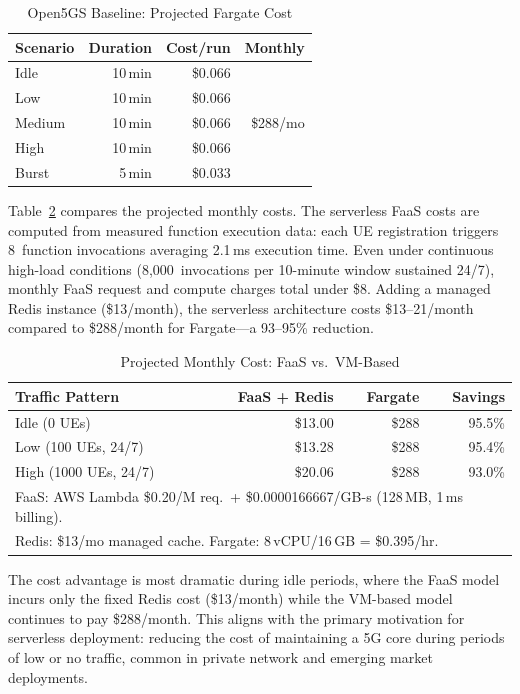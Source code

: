 \documentclass[conference]{IEEEtran}
\begin{document}
\begin{table}[t]
\centering
\caption{Open5GS Baseline: Projected Fargate Cost}
\label{tab:open5gs-cost}
\footnotesize
\begin{tabular}{@{}lrrr@{}}
\toprule
\textbf{Scenario} & \textbf{Duration} & \textbf{Cost/run} & \textbf{Monthly} \\
\midrule
Idle      & 10\,min & \$0.066 & \multirow{5}{*}{\$288/mo} \\
Low       & 10\,min & \$0.066 & \\
Medium    & 10\,min & \$0.066 & \\
High      & 10\,min & \$0.066 & \\
Burst     & 5\,min  & \$0.033 & \\
\bottomrule
\end{tabular}
\end{table}

Table~\ref{tab:cost} compares the projected monthly costs. The serverless FaaS costs are computed from measured function execution data: each UE registration triggers 8~function invocations averaging 2.1\,ms execution time. Even under continuous high-load conditions (8,000~invocations per 10-minute window sustained 24/7), monthly FaaS request and compute charges total under \$8. Adding a managed Redis instance (\$13/month), the serverless architecture costs \$13--21/month compared to \$288/month for Fargate---a 93--95\% reduction.

\begin{table}[t]
\centering
\caption{Projected Monthly Cost: FaaS vs.\ VM-Based}
\label{tab:cost}
\footnotesize
\begin{tabular}{@{}lrrr@{}}
\toprule
\textbf{Traffic Pattern} & \textbf{FaaS + Redis} & \textbf{Fargate} & \textbf{Savings} \\
\midrule
Idle (0 UEs)              & \$13.00  & \$288  & 95.5\% \\
Low (100 UEs, 24/7)       & \$13.28  & \$288  & 95.4\% \\
High (1000 UEs, 24/7)     & \$20.06  & \$288  & 93.0\% \\
\bottomrule
\multicolumn{4}{l}{\scriptsize FaaS: AWS Lambda \$0.20/M req.\ + \$0.0000166667/GB-s (128\,MB, 1\,ms billing).} \\
\multicolumn{4}{l}{\scriptsize Redis: \$13/mo managed cache. Fargate: 8\,vCPU/16\,GB = \$0.395/hr.}
\end{tabular}
\end{table}

The cost advantage is most dramatic during idle periods, where the FaaS model incurs only the fixed Redis cost (\$13/month) while the VM-based model continues to pay \$288/month. This aligns with the primary motivation for serverless deployment: reducing the cost of maintaining a 5G core during periods of low or no traffic, common in private network and emerging market deployments.
\end{document}
